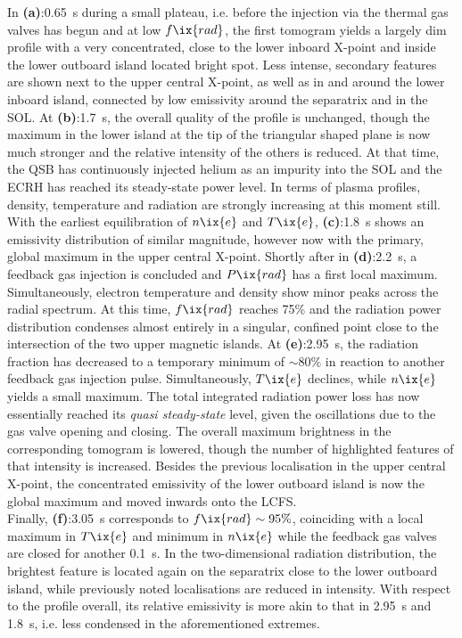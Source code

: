             In \textbf{(a)}:\SI{0.65}{\second} during a small plateau, i.e. before the injection via the thermal gas valves has begun and at low $f\ix{rad}$, the first tomogram yields a largely dim profile with a very concentrated, close to the lower inboard X-point and inside the lower outboard island located bright spot. Less intense, secondary features are shown next to the upper central X-point, as well as in and around the lower inboard island, connected by low emissivity around the separatrix and in the SOL. At \textbf{(b)}:\SI{1.7}{\second}, the overall quality of the profile is unchanged, though the maximum in the lower island at the tip of the triangular shaped plane is now much stronger and the relative intensity of the others is reduced. At that time, the QSB has continuously injected helium as an impurity into the SOL and the ECRH has reached its steady-state power level. In terms of plasma profiles, density, temperature and radiation are strongly increasing at this moment still.\\%
            With the earliest equilibration of $n\ix{e}$ and $T\ix{e}$, \textbf{(c)}:\SI{1.8}{\second} shows an emissivity distribution of similar magnitude, however now with the primary, global maximum in the upper central X-point. Shortly after in \textbf{(d)}:\SI{2.2}{\second}, a feedback gas injection is concluded and $P\ix{rad}$ has a first local maximum. Simultaneously, electron temperature and density show minor peaks across the radial spectrum. At this time, $f\ix{rad}$ reaches 75\% and the radiation power distribution condenses almost entirely in a singular, confined point close to the intersection of the two upper magnetic islands. At \textbf{(e)}:\SI{2.95}{\second}, the radiation fraction has decreased to a temporary minimum of $\sim80\%$ in reaction to another feedback gas injection pulse. Simultaneously, $T\ix{e}$ declines, while $n\ix{e}$ yields a small maximum. The total integrated radiation power loss has now essentially reached its \textit{quasi steady-state} level, given the oscillations due to the gas valve opening and closing. The overall maximum brightness in the corresponding tomogram is lowered, though the number of highlighted features of that intensity is increased. Besides the previous localisation in the upper central X-point, the concentrated emissivity of the lower outboard island is now the global maximum and moved inwards onto the LCFS.\\%
            Finally, \textbf{(f)}:\SI{3.05}{\second} corresponds to $f\ix{rad}\sim95\%$, coinciding with a local maximum in $T\ix{e}$ and minimum in $n\ix{e}$ while the feedback gas valves are closed for another \SI{0.1}{\second}. In the two-dimensional radiation distribution, the brightest feature is located again on the separatrix close to the lower outboard island, while previously noted localisations are reduced in intensity. With respect to the profile overall, its relative emissivity is more akin to that in \SI{2.95}{\second} and \SI{1.8}{\second}, i.e. less condensed in the aforementioned extremes.\\%
